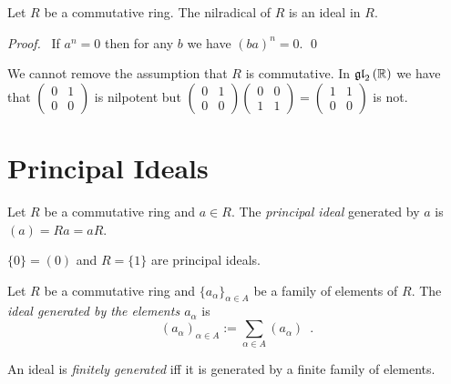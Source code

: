 \begin{prop}
Let $R$ be a commutative ring. The nilradical of $R$ is an ideal in $R$.
\end{prop}

\begin{proof}
\pf\ If $a^n = 0$ then for any $b$ we have $(ba)^n = 0$. \qed
\end{proof}

\begin{ex}
We cannot remove the assumption that $R$ is commutative. In $\mathfrak{gl}_{2} \left( {\mathbb{R}} \right)$ we have that $\left( \begin{array}{cc} 0 & 1 \\ 0 & 0 \end{array} \right)$ is nilpotent but $\left( \begin{array}{cc} 0 & 1 \\ 0 & 0 \end{array} \right) \left( \begin{array}{cc} 0 & 0 \\ 1 & 1 \end{array} \right) = \left( \begin{array}{cc} 1 & 1 \\ 0 & 0 \end{array} \right)$ is not.
\end{ex}

\section{Principal Ideals}

\begin{df}
Let $R$ be a commutative ring and $a \in R$. The \emph{principal ideal} generated by $a$ is $(a) = Ra = aR$.
\end{df}

\begin{ex}
$\{0\} = (0)$ and $R = \{1\}$ are principal ideals.
\end{ex}

\begin{df}
Let $R$ be a commutative ring and $\{a_\alpha\}_{\alpha \in A}$ be a family of elements of $R$. The \emph{ideal generated by the elements $a_\alpha$} is
\[ (a_\alpha)_{\alpha \in A} := \sum_{\alpha \in A} (a_\alpha) \enspace . \]

An ideal is \emph{finitely generated} iff it is generated by a finite family of elements.
\end{df}

